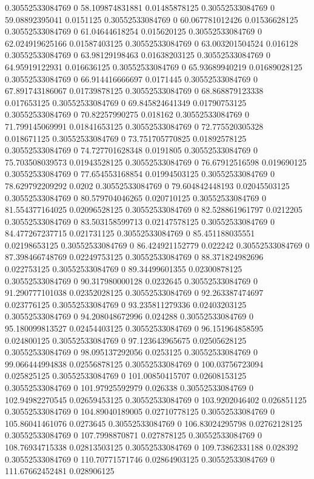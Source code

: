 0.30552533084769 0 58.109874831881 0.01485878125
0.30552533084769 0 59.08892395041 0.0151125
0.30552533084769 0 60.067781012426 0.01536628125
0.30552533084769 0 61.04644618254 0.015620125
0.30552533084769 0 62.024919625166 0.01587403125
0.30552533084769 0 63.003201504524 0.016128
0.30552533084769 0 63.98129198463 0.01638203125
0.30552533084769 0 64.95919122931 0.016636125
0.30552533084769 0 65.93689940219 0.01689028125
0.30552533084769 0 66.914416666697 0.0171445
0.30552533084769 0 67.891743186067 0.01739878125
0.30552533084769 0 68.868879123338 0.017653125
0.30552533084769 0 69.845824641349 0.01790753125
0.30552533084769 0 70.82257990275 0.018162
0.30552533084769 0 71.799145069991 0.01841653125
0.30552533084769 0 72.775520305328 0.018671125
0.30552533084769 0 73.751705770825 0.01892578125
0.30552533084769 0 74.727701628348 0.0191805
0.30552533084769 0 75.703508039573 0.01943528125
0.30552533084769 0 76.67912516598 0.019690125
0.30552533084769 0 77.654553168854 0.01994503125
0.30552533084769 0 78.629792209292 0.0202
0.30552533084769 0 79.604842448193 0.02045503125
0.30552533084769 0 80.579704046265 0.020710125
0.30552533084769 0 81.554377164025 0.02096528125
0.30552533084769 0 82.528861961797 0.0212205
0.30552533084769 0 83.503158599713 0.02147578125
0.30552533084769 0 84.477267237715 0.021731125
0.30552533084769 0 85.451188035551 0.02198653125
0.30552533084769 0 86.424921152779 0.022242
0.30552533084769 0 87.398466748769 0.02249753125
0.30552533084769 0 88.371824982696 0.022753125
0.30552533084769 0 89.34499601355 0.02300878125
0.30552533084769 0 90.317980000128 0.0232645
0.30552533084769 0 91.290777101038 0.02352028125
0.30552533084769 0 92.263387474697 0.023776125
0.30552533084769 0 93.235811279336 0.02403203125
0.30552533084769 0 94.208048672996 0.024288
0.30552533084769 0 95.180099813527 0.02454403125
0.30552533084769 0 96.151964858595 0.024800125
0.30552533084769 0 97.123643965675 0.02505628125
0.30552533084769 0 98.095137292056 0.0253125
0.30552533084769 0 99.066444994838 0.02556878125
0.30552533084769 0 100.03756723094 0.025825125
0.30552533084769 0 101.00850415707 0.02608153125
0.30552533084769 0 101.97925592979 0.026338
0.30552533084769 0 102.94982270545 0.02659453125
0.30552533084769 0 103.9202046402 0.026851125
0.30552533084769 0 104.89040189005 0.02710778125
0.30552533084769 0 105.86041461076 0.0273645
0.30552533084769 0 106.83024295798 0.02762128125
0.30552533084769 0 107.7998870871 0.027878125
0.30552533084769 0 108.76934715338 0.02813503125
0.30552533084769 0 109.73862331188 0.028392
0.30552533084769 0 110.70771571746 0.02864903125
0.30552533084769 0 111.67662452481 0.028906125
